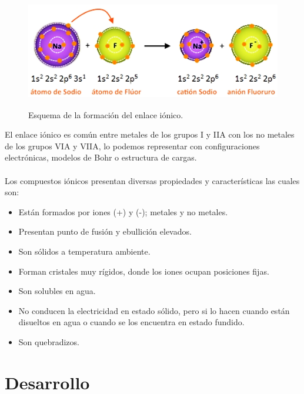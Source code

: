 \documentclass[12pt]{article}
\begin{document}
               \begin{figure}[H]
                    \centering
                    \includegraphics[height=5cm]{EnlaceIonico.png}
                    \caption{Esquema de la formación del enlace iónico.}
               \end{figure}

               El enlace iónico es común entre metales de los grupos I y IIA con los no metales de los grupos VIA y VIIA, lo podemos representar con configuraciones electrónicas, modelos de Bohr o estructura de cargas.\\\\
               Los compuestos iónicos presentan diversas propiedades y características las cuales son:

               \begin{itemize}
                    \item Están formados por iones (+) y (-); metales y no metales.
                    \item Presentan punto de fusión y ebullición elevados.
                    \item Son sólidos a temperatura ambiente.
                    \item Forman cristales muy rígidos, donde los iones ocupan posiciones fijas.
                    \item Son solubles en agua.
                    \item No conducen la electricidad en estado sólido, pero si lo hacen cuando están disueltos en agua o cuando se los encuentra en estado fundido.
                    \item Son quebradizos.
               \end{itemize}

          \section{Desarrollo}\label{sec:Desarrollo}
               
\end{document}
